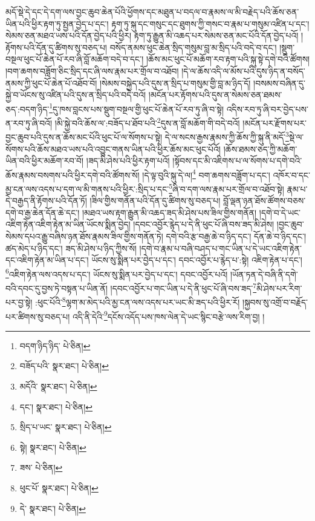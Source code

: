 མདོ་སྡེ་དེ་དང་དེ་དག་ལས་བྱང་ཆུབ་ཆེན་པོའི་ཕྱོགས་དང་མཐུན་པ་བདལ་བ་རྣམས་ལ་མི་བརྗེད་པའི་ཆོས་ཅན་ཡིན་པའི་ཕྱིར་རྟག་ཏུ་སྤྱན་བྱེད་པ་དང་། རྟག་ཏུ་སྐུ་དང་གསུང་དང་ཐུགས་ཀྱི་གསང་བ་རྣམ་པ་གསུམ་འཛིན་པ་དང་། སེམས་ཅན་མཐའ་ཡས་པའི་དོན་བྱེད་པའི་ཕྱིར། རྟག་ཏུ་རྒྱུན་མི་འཆད་པར་སེམས་ཅན་མང་པོའི་དོན་བྱེད་པའོ། །རྟོགས་པའི་དོན་དུ་ཚིགས་སུ་བཅད་པ། བསོད་ནམས་ཕུང་ཆེན་སྲིད་གསུམ་བླ་མ་སྲིད་པའི་བདེ་བ་དང་། །སྡུག་བསྔལ་ཕུང་པོ་ཆེན་པོ་རབ་ཞི་བློ་མཆོག་བདེ་བ་དང་། །ཆོས་མང་ཕུང་པོ་མཆོག་རབ་རྟག་པའི་སྐུ་སྟེ་དགེ་བའི་ཚོགས། །བག་ཆགས་བཟློག་ཅིང་སྲིད་དང་ཞི་ལས་རྣམ་པར་གྲོལ་བ་འཐོབ། །དེ་ལ་ཆོས་འདི་ལ་མོས་པའི་དུས་ཉིད་ན་བསོད་ནམས་ཀྱི་ཕུང་པོ་ཆེན་པོ་འཐོབ་བོ། །སེམས་བསྐྱེད་པའི་དུས་ན་སྲིད་པ་གསུམ་གྱི་བླ་མ་ཉིད་དོ། །བསམས་བཞིན་དུ་སྐྱེ་བ་ཡོངས་སུ་འཛིན་པའི་དུས་ན་སྲིད་པའི་བདེ་བའོ། །མངོན་པར་རྟོགས་པའི་དུས་ན་སེམས་ཅན་ཐམས་ཅད་:བདག་ཉིད་\footnote{བདག་ཉིད་ཉིད་  པེ་ཅིན། }དུ་ཁས་བླངས་པས་སྡུག་བསྔལ་གྱི་ཕུང་པོ་ཆེན་པོ་རབ་ཏུ་ཞི་བ་སྟེ། འདིས་རབ་ཏུ་ཞི་བར་བྱེད་པས་ན་རབ་ཏུ་ཞི་བའོ། །མི་སྐྱེ་བའི་ཆོས་ལ་:བཟོད་པ་ཐོབ་པའི་\footnote{བཟོད་པའི་  སྣར་ཐང་།  པེ་ཅིན། }དུས་ན་བློ་མཆོག་གི་བདེ་བའོ། །མངོན་པར་རྫོགས་པར་བྱང་ཆུབ་པའི་དུས་ན་ཆོས་མང་པོའི་ཕུང་པོ་ལ་སོགས་པ་སྟེ། དེ་ལ་སངས་རྒྱས་རྣམས་ཀྱི་ཆོས་ཀྱི་སྐུ་ནི་མདོ་\footnote{མདོའི་  སྣར་ཐང་།  པེ་ཅིན། }སྡེ་ལ་སོགས་པའི་ཆོས་མཐའ་ཡས་པའི་འབྱུང་གནས་ཡིན་པའི་ཕྱིར་ཆོས་མང་ཕུང་པོའོ། །ཆོས་ཐམས་ཅད་ཀྱི་མཆོག་ཡིན་བའི་ཕྱིར་མཆོག་རབ་བོ། །ཟད་མི་ཤེས་པའི་ཕྱིར་རྟག་པའོ། །སྟོབས་དང་མི་འཇིགས་པ་ལ་སོགས་པ་དགེ་བའི་ཆོས་རྣམས་བསགས་པའི་ཕྱིར་དགེ་བའི་ཚོགས་སོ། །དེ་ལྟ་བུའི་སྐུ་དེ་ལ།\footnote{དང་།  སྣར་ཐང་།  པེ་ཅིན། } བག་ཆགས་བཟློག་པ་དང་། འཁོར་བ་དང་མྱ་ངན་ལས་འདས་པ་དག་ལ་མི་གནས་པའི་ཕྱིར་:སྲིད་པ་དང་\footnote{སྲིད་པ་ཡང་  སྣར་ཐང་།  པེ་ཅིན། }ཞི་བ་དག་ལས་རྣམ་པར་གྲོལ་བ་འཐོབ་སྟེ། རྣམ་པ་དེ་བརྒྱད་ནི་རྟོགས་པའི་དོན་ཏོ། །ཟིལ་གྱིས་གནོན་པའི་དོན་དུ་ཚིགས་སུ་བཅད་པ། བློ་ལྡན་ཉན་ཐོས་ཚོགས་བཅས་དགེ་བ་རྒྱ་ཆེན་དོན་ཆེ་དང་། །མཐའ་ཡས་རྟག་རྒྱུན་མི་འཆད་ཟད་མི་ཤེས་པས་ཟིལ་གྱིས་གནོན། །དགེ་བ་དེ་ཡང་འཇིག་རྟེན་འཇིག་རྟེན་མ་ཡིན་ཡོངས་སྨིན་བྱེད། །དབང་འབྱོར་རྙེད་པ་དེ་ནི་ཕུང་པོ་ཞི་བས་ཟད་མི་ཤེས། །བྱང་ཆུབ་སེམས་དཔའ་རྒྱུ་བཞིས་ཉན་ཐོས་རྣམས་ཟིལ་གྱིས་གནོན་ཏེ། དགེ་བའི་རྩ་བརྒྱ་ཆེ་བ་ཉིད་དང་། དོན་ཆེ་བ་ཉིད་དང་། ཚད་མེད་པ་ཉིད་དང་། ཟད་མི་ཤེས་པ་ཉིད་ཀྱིས་སོ། །དགེ་བ་རྣམ་པ་བཞི་བཤད་པ་གང་ཡིན་པ་དེ་ཡང་འཇིག་རྟེན་དང་འཇིག་རྟེན་མ་ཡིན་པ་དང་། ཡོངས་སུ་སྨིན་པར་བྱེད་པ་དང་། དབང་འབྱོར་པ་རྙེད་པ་:སྟེ། འཇིག་རྟེན་པ་དང་། \footnote{སྟེ།    སྣར་ཐང་།  པེ་ཅིན། }འཇིག་རྟེན་ལས་འདས་པ་དང་། ཡོངས་སུ་སྨིན་པར་བྱེད་པ་དང་། དབང་འབྱོར་པའོ། །ཡོན་ཏན་དེ་བཞི་ནི་དགེ་བའི་དབང་དུ་བྱས་ཏེ་བསྟན་པ་ཡིན་ནོ། །དབང་འབྱོར་པ་གང་ཡིན་པ་དེ་ནི་ཕུང་པོ་ཞི་བས་ཟད་\footnote{ཟས་  པེ་ཅིན། }མི་ཤེས་པར་རིག་པར་བྱ་སྟེ། :ཕུང་པོའི་\footnote{ཕུང་པོ་  སྣར་ཐང་།  པེ་ཅིན། }ལྷག་མ་མེད་པའི་མྱ་ངན་ལས་འདས་པར་ཡང་མི་ཟད་པའི་ཕྱིར་རོ། །སྐྱབས་སུ་འགྲོ་བ་བརྗོད་པར་ཚིགས་སུ་བཅད་པ། འདི་ནི་དེའི་\footnote{དེ་  སྣར་ཐང་།  པེ་ཅིན། }དངོས་འདོད་པས་ཁས་ལེན་དེ་ཡང་སྙིང་བརྩེ་ལས་རིག་བྱ། །
